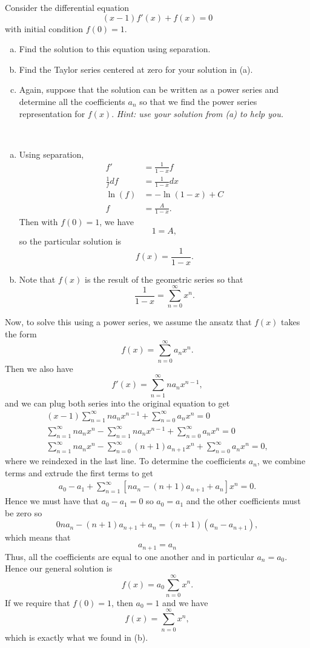 \documentclass[12pt]{article} %
\begin{document}
\newpage
\begin{problem}
Consider the differential equation
\[
(x-1)f'(x) + f(x)=0
\]
with initial condition $f(0)=1$.
\begin{enumerate}[(a)]
    \item Find the solution to this equation using separation.
    \item Find the Taylor series centered at zero for your solution in (a).
    \item Again, suppose that the solution can be written as a power series and determine all the coefficients $a_n$ so that we find the power series representation for $f(x)$. \emph{Hint: use your solution from (a) to help you.}
\end{enumerate}
\end{problem}
\begin{solution}~
\begin{enumerate}[(a)]
    \item Using separation,
    \begin{align*}
        f'&=\frac{1}{1-x}f\\
        \frac{1}{f}df&=\frac{1}{1-x}dx\\
        \ln(f)&= -\ln(1-x)+C\\
        f&= \frac{A}{1-x}.
    \end{align*}
    Then with $f(0)=1$, we have
    \[
    1=A,
    \]
    so the particular solution is
    \[
    f(x)=\frac{1}{1-x}.
    \]
    \item Note that $f(x)$ is the result of the geometric series so that
    \[
    \frac{1}{1-x}=\sum_{n=0}^\infty x^n.
    \]

\end{enumerate}
\item Now, to solve this using a power series, we assume the ansatz that $f(x)$ takes the form
\[
f(x)=\sum_{n=0}^\infty a_nx^n.
\]
Then we also have
\[
f'(x)=\sum_{n=1}^\infty na_n x^{n-1},
\]
and we can plug both series into the original equation to get
\begin{align*}
    (x-1)\sum_{n=1}^\infty na_n x^{n-1} +  \sum_{n=0}^\infty a_nx^n = 0\\
    \sum_{n=1}^\infty na_n x^{n}-\sum_{n=1}^\infty na_n x^{n-1} +  \sum_{n=0}^\infty a_nx^n = 0\\
    \sum_{n=1}^\infty na_n x^{n}-\sum_{n=0}^\infty (n+1)a_{n+1} x^{n} +  \sum_{n=0}^\infty a_nx^n = 0,
\end{align*}
where we reindexed in the last line. To determine the coefficients $a_n$, we combine terms and extrude the first terms to get
\begin{align*}
    a_0- a_1 + \sum_{n=1}^\infty [na_n -(n+1)a_{n+1}+a_n]x^n =0.
\end{align*}
Hence we must have that $a_0 - a_1=0$ so $a_0=a_1$ and the other coefficients must be zero so
\[
0n a_n - (n+1)a_{n+1} + a_n = (n+1)(a_n-a_{n+1}), 
\]
which means that
\[
a_{n+1}= a_n
\]
Thus, all the coefficients are equal to one another and in particular $a_n=a_0$. Hence our general solution is
\[
f(x)=a_0 \sum_{n=0}^\infty x^n.
\]
If we require that $f(0)=1$, then $a_0=1$ and we have
\[
f(x)=\sum_{n=0}^\infty x^n,
\]
which is exactly what we found in (b).
\end{solution}
\end{document}

